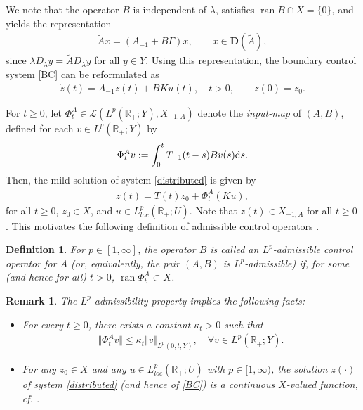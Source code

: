 \documentclass[onecolumn]{autart}
\def\R{{\mathbb{R}}}
\def\R{\mathbb R}
\newtheorem{definition}{Definition}[section]
\newtheorem{remark}{Remark}[section]
\numberwithin{equation}{section}
\begin{document}
    We note that the operator $B$ is independent of $\lambda$, satisfies $\operatorname{ran} B \cap X = \{0\}$, and yields the representation
	\begin{align}\label{representation}
		\tilde{A}x = (A_{-1} + B \Gamma)x, \qquad x \in {\bm D}(\tilde{A}),
	\end{align}
	since $\lambda D_\lambda y = \tilde{A}D_\lambda y$ for all $y \in Y$. Using this representation, the boundary control system \eqref{BC} can be reformulated as
	\begin{align}\label{distributed}
		\dot{z}(t)= A_{-1}z(t)+B K u(t),\quad t>0,\qquad z(0)=z_0.
	\end{align}
	
       For $t \ge 0$, let $\Phi_t^A \in \mathcal{L}(L^p(\R_+;Y), X_{-1,A})$ denote the \emph{input-map} of $(A,B)$, defined for each $v \in L^p(\R_+;Y)$ by
       \begin{align*}
		\Phi_{t}^A v:=\int_{0}^{t}T_{-1}(t-s)Bv(s){\rm{d}}s.
	\end{align*}
	Then, the mild solution of system \eqref{distributed} is given by
	\begin{align}\label{S2.2}
		z(t)=T(t)z_0+\Phi_{t}^A (Ku),
	\end{align}
	for all $t\ge 0$, $z_0\in X$, and $u\in L^{p}_{loc}(\R_+;U)$. Note that $z(t) \in X_{-1,A}$ for all $t \ge 0$. This motivates the following definition of admissible control operators \cite{WC}.
	\begin{definition}\label{Def.B-admi}
	 For $p \in [1, \infty]$, the operator $B$ is called an \emph{$L^p$-admissible control operator} for $A$ (or, equivalently, the pair $(A,B)$ is $L^p$-admissible) if, for some (and hence for all) $t > 0$, $\operatorname{ran} \Phi_{t}^A \subset X$.	
	\end{definition}
	
	\begin{remark}
		The ${L^p}$-admissibility property implies the following facts:
		\begin{itemize}
			\item[(i)] For every $t \ge 0$, there exists a constant $\kappa_t > 0$ such that
			\begin{align*}
				\Vert \Phi_{t}^A v \Vert \leq \kappa_t \Vert v \Vert_{L^{p}(0,t;Y)}, \quad \forall v \in L^{p}(\mathbb{R}_+;Y).
			\end{align*}
			\item[(ii)] {For any $z_0 \in X$ and any $u \in L^{p}_{loc}(\R_+;U)$ with $p \in [1,\infty)$, the solution $z(\cdot)$ of system \eqref{distributed} (and hence of \eqref{BC}) is a continuous $X$-valued function, cf. \cite[Prop. 2.3]{WC}}.
		\end{itemize}
	\end{remark}
	
\end{document}
